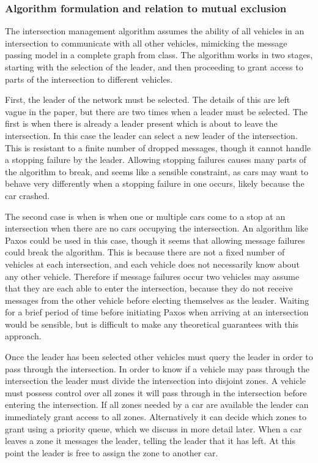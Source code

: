 \documentclass[12pt]{article}
\begin{document}
\subsubsection{Algorithm formulation and relation to mutual exclusion}
The intersection management algorithm assumes the ability of all vehicles in an intersection to communicate with all other vehicles, mimicking the message passing model in a complete graph from class. The algorithm works in two stages, starting with the selection of the leader, and then proceeding to grant access to parts of the intersection to different vehicles. \par
First, the leader of the network must be selected. The details of this are left vague in the paper, but there are two times when a leader must be selected. The first is when there is already a leader present which is about to leave the intersection. In this case the leader can select a new leader of the intersection. This is resistant to a finite number of dropped messages, though it cannot handle a stopping failure by the leader. Allowing stopping failures causes many parts of the algorithm to break, and seems like a sensible constraint, as cars may want to behave very differently when a stopping failure in one occurs, likely because the car crashed.\par
The second case is when is when one or multiple cars come to a stop at an intersection when there are no cars occupying the intersection. An algorithm like Paxos could be used in this case, though it seems that allowing message failures could break the algorithm. This is because there are not a fixed number of vehicles at each intersection, and each vehicle does not necessarily know about any other vehicle. Therefore if message failures occur two vehicles may assume that they are each able to enter the intersection, because they do not receive messages from the other vehicle before electing themselves as the leader. Waiting for a brief period of time before initiating Paxos when arriving at an intersection would be sensible, but is difficult to make any theoretical guarantees with this approach. \par
Once the leader has been selected other vehicles must query the leader in order to pass through the intersection. In order to know if a vehicle may pass through the intersection the leader must divide the intersection into disjoint zones. A vehicle must possess control over all zones it will pass through in the intersection before entering the intersection. If all zones needed by a car are available the leader can immediately grant access to all zones. Alternatively it can decide which zones to grant using a priority queue, which we discuss in more detail later. When a car leaves a zone it messages the leader, telling the leader that it has left. At this point the leader is free to assign the zone to another car. \par
\end{document}
